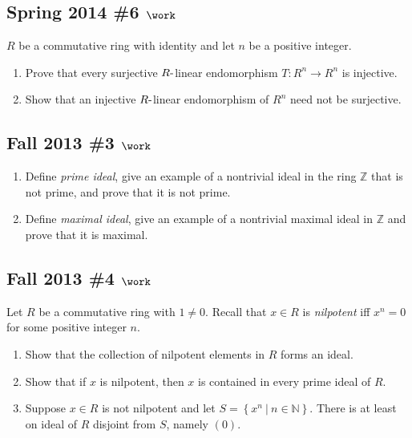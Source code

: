 \hypertarget{spring-2014-6-work}{%
\subsection{\texorpdfstring{Spring 2014 \#6
\(\work\)}{Spring 2014 \#6 \textbackslash work}}\label{spring-2014-6-work}}

\(R\) be a commutative ring with identity and let \(n\) be a positive
integer.

\begin{enumerate}
\def\labelenumi{\alph{enumi}.}
\item
  Prove that every surjective \(R{\hbox{-}}\)linear endomorphism
  \(T: R^n \to R^n\) is injective.
\item
  Show that an injective \(R{\hbox{-}}\)linear endomorphism of \(R^n\)
  need not be surjective.
\end{enumerate}

\hypertarget{fall-2013-3-work}{%
\subsection{\texorpdfstring{Fall 2013 \#3
\(\work\)}{Fall 2013 \#3 \textbackslash work}}\label{fall-2013-3-work}}

\begin{enumerate}
\def\labelenumi{\alph{enumi}.}
\item
  Define \emph{prime ideal}, give an example of a nontrivial ideal in
  the ring \({\mathbb{Z}}\) that is not prime, and prove that it is not
  prime.
\item
  Define \emph{maximal ideal}, give an example of a nontrivial maximal
  ideal in \({\mathbb{Z}}\) and prove that it is maximal.
\end{enumerate}

\hypertarget{fall-2013-4-work}{%
\subsection{\texorpdfstring{Fall 2013 \#4
\(\work\)}{Fall 2013 \#4 \textbackslash work}}\label{fall-2013-4-work}}

Let \(R\) be a commutative ring with \(1\neq 0\). Recall that \(x\in R\)
is \emph{nilpotent} iff \(x^n = 0\) for some positive integer \(n\).

\begin{enumerate}
\def\labelenumi{\alph{enumi}.}
\item
  Show that the collection of nilpotent elements in \(R\) forms an
  ideal.
\item
  Show that if \(x\) is nilpotent, then \(x\) is contained in every
  prime ideal of \(R\).
\item
  Suppose \(x\in R\) is not nilpotent and let
  \(S = \left\{{x^n {~\mathrel{\Big|}~}n\in {\mathbb{N}}}\right\}\).
  There is at least on ideal of \(R\) disjoint from \(S\), namely
  \((0)\).
\end{enumerate}

